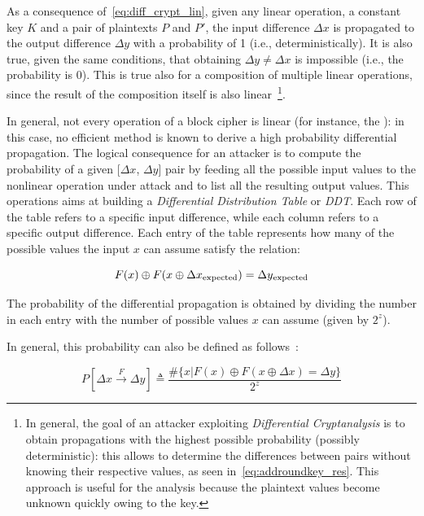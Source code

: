                 As a consequence of~\ref{eq:diff_crypt_lin}, given any linear operation, a constant key $K$ and a pair of plaintexts $P$ and $P'$, the input difference $\Delta x$ is propagated to the output difference $\Delta y$ with a probability of 1 (i.e., deterministically). It is also true, given the same conditions, that obtaining $\Delta y \neq \Delta x$ is impossible (i.e., the probability is $0$). This is true also for a composition of multiple linear operations, since the result of the composition itself is also linear~\footnote{In general, the goal of an attacker exploiting \emph{Differential Cryptanalysis} is to obtain propagations with the highest possible probability (possibly deterministic): this allows to determine the differences between pairs without knowing their respective values, as seen in~\ref{eq:addroundkey_res}. This approach is useful for the analysis because the plaintext values become unknown quickly owing to the key.}.

                In general, not every operation of a block cipher is linear (for instance, the \aes{} \sbocs{}): in this case, no efficient method is known to derive a high probability differential propagation. The logical consequence for an attacker is to compute the probability of a given [$\Delta x$, $\Delta y$] pair by feeding all the possible input values to the nonlinear operation under attack and to list all the resulting output values. This operations aims at building a \emph{Differential Distribution Table} or \emph{DDT}. Each row of the table refers to a specific input difference, while each column refers to a specific output difference. Each entry of the table represents how many of the possible values the input $x$ can assume satisfy the relation:

                \begin{equation}
                    F(x) \oplus F(x \oplus \Delta x \textsubscript{expected}) = \Delta y \textsubscript{expected}
                \end{equation}

                \noindent The probability of the differential propagation is obtained by dividing the number in each entry with the number of possible values $x$ can assume (given by $2^z$).

                \noindent In general, this probability can also be defined as follows~\cite{sakiyama2016security}:

                \begin{equation}\label{eq:diff_crypt_general_prob}
                    P[\Delta x \xrightarrow[]{F} \Delta y] \triangleq \frac{\#\{x|F(x) \oplus F(x \oplus \Delta x) = \Delta y\}}{2^z}
                \end{equation}

